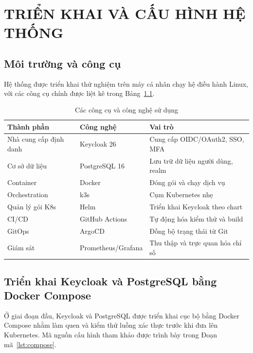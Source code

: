 \chapter{TRIỂN KHAI VÀ CẤU HÌNH HỆ THỐNG}
\label{ch:trienkhai}

\section{Môi trường và công cụ}
\label{sec:moitruong}

Hệ thống được triển khai thử nghiệm trên máy cá nhân chạy hệ điều hành Linux,
với các công cụ chính được liệt kê trong Bảng~\ref{tab:tools}.

\begin{table}[htbp]
\centering
\caption{Các công cụ và công nghệ sử dụng}
\label{tab:tools}
\small
\begin{tabular}{p{3.2cm} p{3.2cm} p{6.4cm}}
\toprule
\textbf{Thành phần} & \textbf{Công nghệ} & \textbf{Vai trò}\\
\midrule
Nhà cung cấp định danh & Keycloak 26 & Cung cấp OIDC/OAuth2, SSO, MFA\\
Cơ sở dữ liệu & PostgreSQL 16 & Lưu trữ dữ liệu người dùng, realm\\
Container & Docker & Đóng gói và chạy dịch vụ\\
Orchestration & k3s & Cụm Kubernetes nhẹ\\
Quản lý gói K8s & Helm & Triển khai Keycloak theo chart\\
CI/CD & GitHub Actions & Tự động hóa kiểm thử và build\\
GitOps & ArgoCD & Đồng bộ trạng thái từ Git\\
Giám sát & Prometheus/Grafana & Thu thập và trực quan hóa chỉ số\\
\bottomrule
\end{tabular}
\end{table}

\section{Triển khai Keycloak và PostgreSQL bằng Docker Compose}
\label{sec:compose}

Ở giai đoạn đầu, Keycloak và PostgreSQL được triển khai cục bộ bằng Docker
Compose nhằm làm quen và kiểm thử luồng xác thực trước khi đưa lên Kubernetes.
Mã nguồn cấu hình tham khảo được trình bày trong
Đoạn mã~\ref{lst:compose}.

